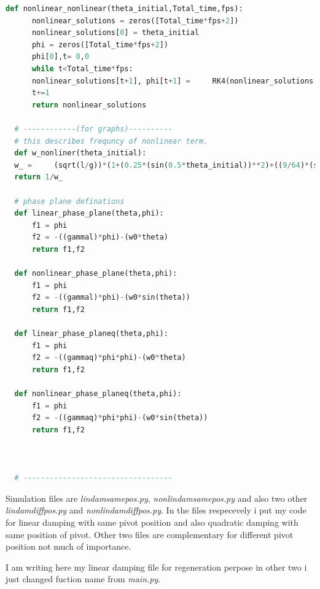 \documentclass[11pt,a4paper]{article}
\begin{document}
\begin{lstlisting}[language=Python]
  def nonlinear_nonlinear(theta_initial,Total_time,fps):
      nonlinear_solutions = zeros([Total_time*fps+2])
      nonlinear_solutions[0] = theta_initial
      phi = zeros([Total_time*fps+2])
      phi[0],t= 0,0
      while t<Total_time*fps:
      nonlinear_solutions[t+1], phi[t+1] =     RK4(nonlinear_solutions[t],phi[t],1/fps,f2nonlinear_nonlinear)
      t+=1
      return nonlinear_solutions

  # ------------(for graphs)----------
  # this describes frequncy of nonlinear term.
  def w_nonliner(theta_initial):
  w_ =     (sqrt(l/g))*(1+(0.25*(sin(0.5*theta_initial))**2)+((9/64)*(sin(theta_initial*0.5))**4))
  return 1/w_

  # phase plane definations
  def linear_phase_plane(theta,phi):
      f1 = phi
      f2 = -((gammal)*phi)-(w0*theta)
      return f1,f2

  def nonlinear_phase_plane(theta,phi):
      f1 = phi
      f2 = -((gammal)*phi)-(w0*sin(theta))
      return f1,f2

  def linear_phase_planeq(theta,phi):
      f1 = phi
      f2 = -((gammaq)*phi*phi)-(w0*theta)
      return f1,f2

  def nonlinear_phase_planeq(theta,phi):
      f1 = phi
      f2 = -((gammaq)*phi*phi)-(w0*sin(theta))
      return f1,f2



  # ----------------------------------

\end{lstlisting}

Simulation files are \emph{lindamsamepos.py}, \emph{nonlindamsamepos.py} and also two other \emph{lindamdiffpos.py} and \emph{nonlindamdiffpos.py}. In the files respecevely i put my code for linear damping with same pivot position and also quadratic damping with same position of pivot. Other two files are complementary for different pivot position not much of importance.

I am writing here my linear damping file for regeneration perpose in other two i just changed fuction name from \emph{main.py}.
\end{document}
